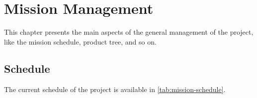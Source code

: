 %
%
%
%
%

%
%
%
%
%

\chapter{Mission Management} \label{ch:management}

This chapter presents the main aspects of the general management of the project, like the mission schedule, product tree, and so on.


\section{Schedule}

The current schedule of the project is available in \autoref{tab:mission-schedule}.

